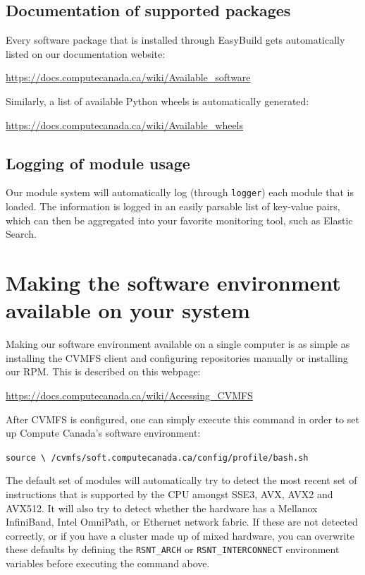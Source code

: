 \documentclass[sigconf]{acmart}
\begin{document}
\subsection{Documentation of supported packages}
\label{sub:Documentation}
Every software package that is installed through EasyBuild gets automatically listed on our documentation website:
\begin{center}
    \url{https://docs.computecanada.ca/wiki/Available_software}
\end{center}
Similarly, a list of available Python wheels is automatically generated:
\begin{center}
\url{https://docs.computecanada.ca/wiki/Available_wheels}    
\end{center}

\subsection{Logging of module usage}
\label{sub:Logging}
Our module system will automatically log (through \texttt{logger}) each module that is loaded. The information is logged in an easily parsable list of key-value pairs, which can then be aggregated into your favorite monitoring tool, such as Elastic Search. 

\section{Making the software environment available on your system}
\label{sec:Making_it_available}
Making our software environment available on a single computer is as simple as installing the CVMFS client and configuring repositories manually or installing our RPM. This is described on this webpage:
\begin{center}
    \url{https://docs.computecanada.ca/wiki/Accessing_CVMFS}
\end{center}

After CVMFS is configured, one can simply execute this command in order to set up Compute Canada's software environment: 

\begin{center}
\texttt{source \textbackslash \linebreak
/cvmfs/soft.computecanada.ca/config/profile/bash.sh}
\end{center}

The default set of modules will automatically try to detect the most recent set of instructions that is supported by the CPU amongst  SSE3, AVX, AVX2 and AVX512. It will also try to detect whether the hardware has a Mellanox InfiniBand, Intel OmniPath, or Ethernet network fabric. If these are not detected correctly, or if you have a cluster made up of mixed hardware, you can overwrite these defaults by defining the \texttt{RSNT\_ARCH} or \texttt{RSNT\_INTERCONNECT} environment variables before executing the command above. 
\end{document}
